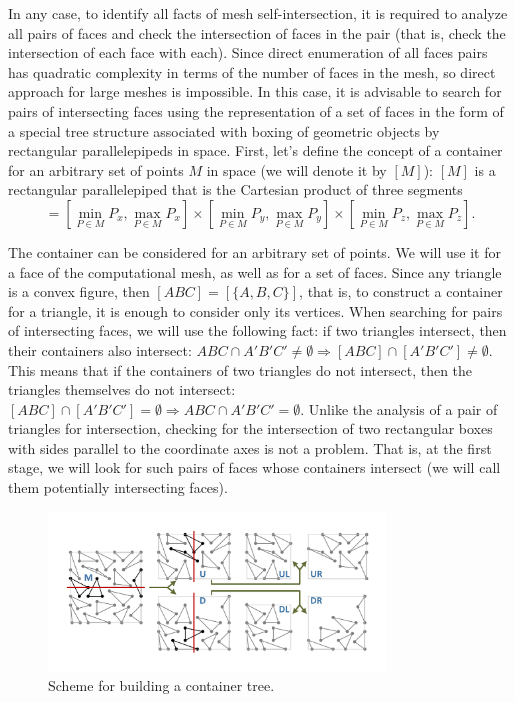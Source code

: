 In any case, to identify all facts of mesh self-intersection, it is required to analyze all pairs of faces and check the intersection of faces in the pair (that is, check the intersection of each face with each).
Since direct enumeration of all faces pairs has quadratic complexity in terms of the number of faces in the mesh, so direct approach for large meshes is impossible.
In this case, it is advisable to search for pairs of intersecting faces using the representation of a set of faces in the form of a special tree structure associated with boxing of geometric objects by rectangular parallelepipeds in space.
First, let's define the concept of a container for an  arbitrary set
of points $M$ in space (we will denote it by $[M]$): $[M]$ is a
rectangular parallelepiped that is the Cartesian product of three
segments
\begin{equation*}
[M] = \left[\min_{P \in M}{P_x}, \max_{P \in M}{P_x}\right]
      \times \left[\min_{P \in M}{P_y}, \max_{P \in M}{P_y}\right]
      \times \left[\min_{P \in M}{P_z}, \max_{P \in M}{P_z}\right].
\end{equation*}

The container can be considered for an arbitrary set of points.
We will use it for a face of the computational mesh, as well as for a set of faces.
Since any triangle is a convex figure, then $[ABC] = [\{A, B, C\}]$, that is, to construct a container for a triangle, it is enough to consider only its vertices.
When searching for pairs of intersecting faces, we will use the following fact: if two triangles intersect, then their containers also intersect: $ABC \cap A'B'C' \ne \emptyset \Rightarrow [ABC] \cap [A'B'C'] \ne\emptyset$.
This means that if the containers of two triangles do not
intersect, then the triangles themselves do not intersect: $[ABC]
\cap [A'B'C'] = \emptyset \Rightarrow ABC \cap A'B'C' = \emptyset$.
Unlike the analysis of a pair of triangles for intersection,
checking for  the intersection of two rectangular boxes with sides
parallel to the coordinate axes is not a problem.
That is, at the first stage, we will look for such pairs of faces
whose  containers intersect (we will call them potentially
intersecting faces).

\begin{figure}[h]
\centering
\includegraphics[width=0.8\textwidth]{pics/text_1_int/pic_box.pdf}
\caption{Scheme for building a container tree.}\label{fig:pic_box}
\end{figure}

